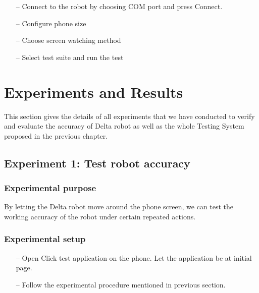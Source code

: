 	\begin{itemize}
		\item[--] Connect to the robot by choosing COM port and press Connect.
		\item[--] Configure phone size
		\item[--] Choose screen watching method
		\item[--] Select test suite and run the test
	\end{itemize}

\section{Experiments and Results}
This section gives the details of all experiments that we have conducted to verify and evaluate the accuracy of Delta robot as well as the whole Testing System proposed in the previous chapter.

\subsection{Experiment 1: Test robot accuracy}
\subsubsection{Experimental purpose}
By letting the Delta robot move around the phone screen, we can test the working accuracy of the robot under certain repeated actions.

\subsubsection{Experimental setup}
	\begin{itemize}
		\item[--]Open Click test application on the phone. Let the application be at initial page.
		\item[--]Follow the experimental procedure mentioned in previous section.
	\end{itemize}

